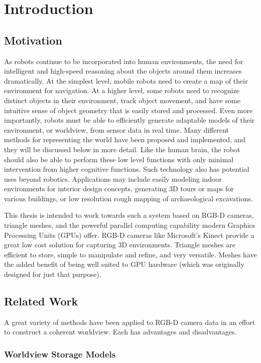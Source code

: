 \chapter{Introduction} %
\section{Motivation}
As robots continue to be incorporated into human environments, the need for intelligent and high-speed reasoning about the objects around them increases dramatically. At the simplest level, mobile robots need to create a map of their environment for navigation. At a higher level, some robots need to recognize distinct objects in their environment, track object movement, and have some intuitive sense of object geometry that is easily stored and processed. Even more importantly, robots must be able to efficiently generate adaptable models of their environment, or worldview, from sensor data in real time. Many different methods for representing the world have been proposed and implemented, and they will be discussed below in more detail. Like the human brain, the robot should also be able to perform these low level functions with only minimal intervention from higher cognitive functions. Such technology also has potential uses beyond robotics. Applications may include easily modeling indoor environments for interior design concepts, generating 3D tours or maps for various buildings, or low resolution rough mapping of archaeological excavations.\par
This thesis is intended to work towards such a system based on RGB-D cameras, triangle meshes, and the powerful parallel computing capability modern Graphics Processing Units (GPUs) offer. RGB-D cameras like Microsoft's Kinect provide a great low cost solution for capturing 3D environments. Triangle meshes are efficient to store, simple to manipulate and refine, and very versatile. Meshes have the added benefit of being well suited to GPU hardware (which was originally designed for just that purpose).
\section{Related Work} %
A great variety of methods have been applied to RGB-D camera data in an effort to construct a coherent worldview. Each has advantages and disadvantages.
\subsection{Worldview Storage Models}
